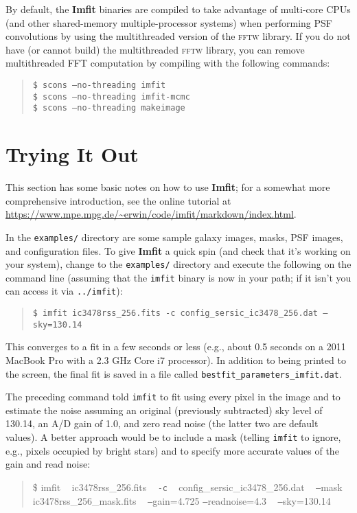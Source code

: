 \documentclass[10pt,a4paper,article]{memoir}
\newcommand{\imfit}{\textbf{Imfit}}
\newcommand{\Imfit}{\textbf{Imfit}}
\newcommand{\imfitprog}{\texttt{imfit}}
\begin{document}
By default, the \Imfit{} binaries are compiled to take advantage of
multi-core CPUs (and other shared-memory multiple-processor systems)
when performing PSF convolutions by using the multithreaded version of
the \textsc{fftw} library. If you do not have (or cannot build) the
multithreaded \textsc{fftw} library, you can remove multithreaded FFT
computation by compiling with the following commands:
\begin{quote}
\texttt{\$ scons --no-threading imfit} \\
\texttt{\$ scons --no-threading imfit-mcmc} \\
\texttt{\$ scons --no-threading makeimage}
\end{quote}





\newpage

\chapter{Trying It Out}

This section has some basic notes on how to use \Imfit; for a somewhat more comprehensive
introduction, see the online tutorial at \url{https://www.mpe.mpg.de/~erwin/code/imfit/markdown/index.html}.

In the \texttt{examples/} directory are some sample galaxy images, masks, PSF images, and
configuration files. To give \imfit{} a quick spin (and check that it's working on your system), change to the
\texttt{examples/} directory and execute the following on the command line (assuming that
the \imfitprog{} binary is now in your path; if it isn't you can access it via
\texttt{../imfit}):
\begin{quote}
\texttt{\$ imfit ic3478rss\_256.fits \texttt{-c} config\_sersic\_ic3478\_256.dat \texttt{--}sky=130.14}
\end{quote}

This converges to a fit in a few seconds or less (e.g., about 0.5 seconds on a 
2011 MacBook Pro with a 2.3 GHz Core i7 processor). In addition to being printed to
the screen, the final fit is saved in a file called \texttt{bestfit\_parameters\_imfit.dat}.

The preceding command told \imfitprog{} to fit using every pixel in the image and to estimate
the noise assuming an original (previously subtracted) sky level of 130.14, an A/D gain
of 1.0, and zero read noise (the latter two are default values). A better approach would be 
to include a mask (telling \imfitprog{}
to ignore, e.g., pixels occupied by bright stars) and to specify more accurate values
of the gain and read noise:
\begin{quote}
\$ imfit ~ ic3478rss\_256.fits ~ \texttt{-c} ~ config\_sersic\_ic3478\_256.dat ~ \texttt{--}mask ~ ic3478rss\_256\_mask.fits ~ \texttt{--}gain=4.725 \texttt{--}readnoise=4.3 ~ \texttt{--}sky=130.14
\end{quote}
\end{document}
